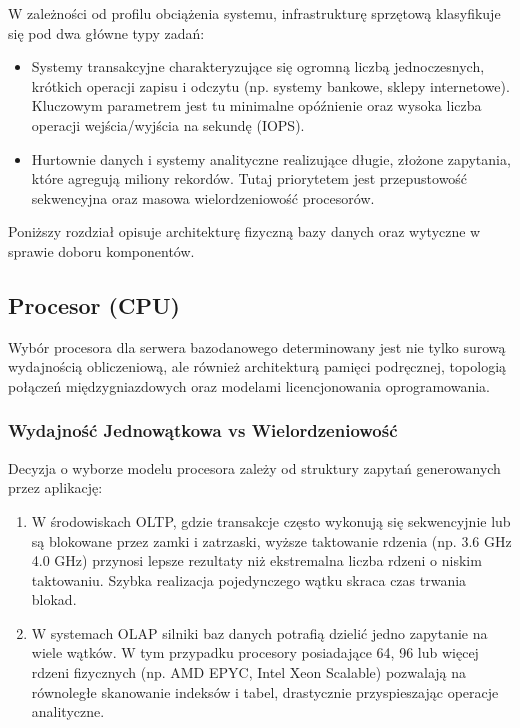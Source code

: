 \documentclass[letterpaper,10pt,polish]{sphinxmanual}
\begin{document}
\sphinxAtStartPar
W zależności od profilu obciążenia systemu, infrastrukturę sprzętową klasyfikuje się pod dwa główne typy zadań:
\begin{itemize}
\item {} 
\sphinxAtStartPar
{} Systemy transakcyjne charakteryzujące się ogromną liczbą jednoczesnych, krótkich operacji zapisu i odczytu (np. systemy bankowe, sklepy internetowe). Kluczowym parametrem jest tu minimalne opóźnienie oraz wysoka liczba operacji wejścia/wyjścia na sekundę (IOPS).

\item {} 
\sphinxAtStartPar
{} Hurtownie danych i systemy analityczne realizujące długie, złożone zapytania, które agregują miliony rekordów. Tutaj priorytetem jest przepustowość sekwencyjna oraz masowa wielordzeniowość procesorów.

\end{itemize}

\sphinxAtStartPar
Poniższy rozdział opisuje architekturę fizyczną bazy danych oraz wytyczne w sprawie doboru komponentów.


\subsection{Procesor (CPU)}
\label{\detokenize{rozdzia_u0142_2/rozdzia_u0142_21/index:procesor-cpu}}
\sphinxAtStartPar
Wybór procesora dla serwera bazodanowego determinowany jest nie tylko surową wydajnością obliczeniową, ale również architekturą pamięci podręcznej, topologią połączeń międzygniazdowych oraz modelami licencjonowania oprogramowania.


\subsubsection{Wydajność Jednowątkowa vs Wielordzeniowość}
\label{\detokenize{rozdzia_u0142_2/rozdzia_u0142_21/index:wydajnosc-jednowatkowa-vs-wielordzeniowosc}}
\sphinxAtStartPar
Decyzja o wyborze modelu procesora zależy od struktury zapytań generowanych przez aplikację:
\begin{enumerate}
%
\item {} 
\sphinxAtStartPar
{} W środowiskach OLTP, gdzie transakcje często wykonują się sekwencyjnie lub są blokowane przez zamki i zatrzaski, wyższe taktowanie rdzenia (np. 3.6 GHz \sphinxhyphen{} 4.0 GHz) przynosi lepsze rezultaty niż ekstremalna liczba rdzeni o niskim taktowaniu. Szybka realizacja pojedynczego wątku skraca czas trwania blokad.

\item {} 
\sphinxAtStartPar
{} W systemach OLAP silniki baz danych potrafią dzielić jedno zapytanie na wiele wątków. W tym przypadku procesory posiadające 64, 96 lub więcej rdzeni fizycznych (np. AMD EPYC, Intel Xeon Scalable) pozwalają na równoległe skanowanie indeksów i tabel, drastycznie przyspieszając operacje analityczne.

\end{enumerate}
\end{document}
